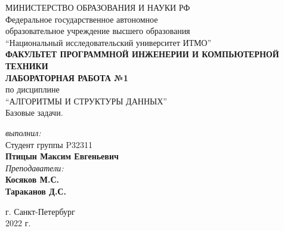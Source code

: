 \thispagestyle{empty}
\BgThispage
\begin{center}
	МИНИСТЕРСТВО ОБРАЗОВАНИЯ И НАУКИ РФ\\
	\hfill \break
	Федеральное государственное автономное\\
	образовательное учреждение высшего образования\\
	``Национальный исследовательский университет ИТМО''\\
	\hfill \break
	\textbf{ФАКУЛЬТЕТ ПРОГРАММНОЙ ИНЖЕНЕРИИ И КОМПЬЮТЕРНОЙ ТЕХНИКИ}\\
	\vspace{2cm}
	\large{\textbf{ЛАБОРАТОРНАЯ РАБОТА №1}}\\
	\hfill \break
	по дисциплине\\
	\large{``АЛГОРИТМЫ И СТРУКТУРЫ ДАННЫХ''}\\
	Базовые задачи.\\
	\hfill \break
	\vspace{3cm}
	\begin{flushright}
	\textit{выполнил:}\\
	Студент группы P32311\\
	\textbf{Птицын Максим Евгеньевич}\\
	\textit{Преподаватели:}\\
	\textbf{Косяков М.С.} \\
	\textbf{Тараканов Д.С.}
	\end{flushright}
\end{center}

\vfill

\begin{center} г. Санкт-Петербург\\2022 г.
\end{center}
\thispagestyle{empty}

\newpage
